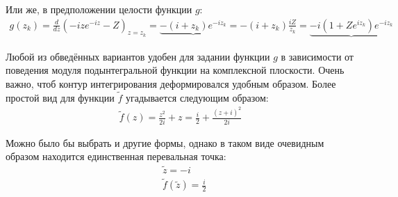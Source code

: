 \documentclass[a4paper, 12pt]{article}
\begin{document}
Или же, в предположении целости функции $g$:
\begin{equation}
\begin{aligned}
    g(z_k) = \frac{d}{dz}\left(-ize^{-iz}-Z\right)_{z=z_k}  = \underbrace{-(i+z_k)e^{-iz_k}} = -(i+z_k)\frac{iZ}{z_k} = \underbrace{-i(1+Ze^{i z_k})e^{-iz_k}}
\end{aligned}
\end{equation}

Любой из обведённых вариантов удобен для задании функции $g$ в зависимости от поведения модуля подынтегральной функции на комплексной плоскости. Очень важно, чтоб контур интегрирования деформировался удобным образом. Более простой вид для функции $\tilde f$ угадывается следующим образом:
\begin{equation}
\begin{aligned}
    \tilde f(z) = \frac{z^2}{2i} + z = \frac{i}{2} + \frac{(z+i)^2}{2i}
\end{aligned}
\end{equation}

Можно было бы выбрать и другие формы, однако в таком виде очевидным образом находится единственная перевальная точка:
\begin{equation}
\begin{aligned}
    &\tilde z = -i\\
    &\tilde f(\tilde z) = \frac{i}{2}
\end{aligned}
\end{equation}
    
\end{document}
